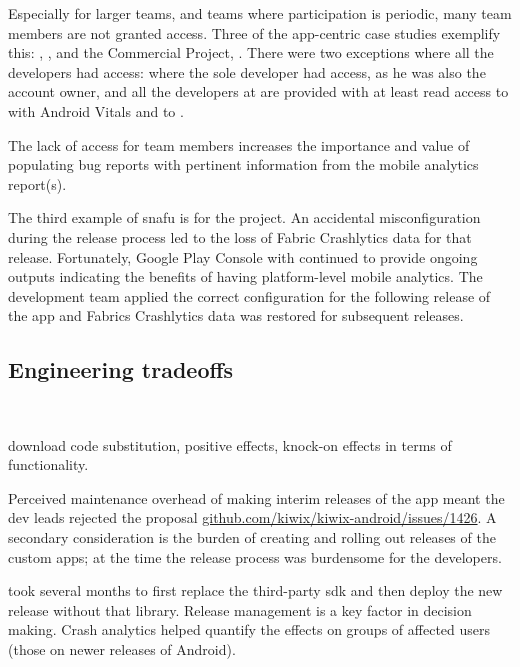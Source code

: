 Especially for larger teams, and teams where participation is periodic, many team members are not granted access. Three of the app-centric case studies exemplify this: , , and the Commercial Project, . There were two exceptions where all the developers had access:  where the sole developer had access, as he was also the account owner, and all the developers at  are provided with at least read access to  with Android Vitals and to .

The lack of access for team members increases the importance and value of populating bug reports with pertinent information from the mobile analytics report(s).

The third example of \Gls{snafu} is for the  project. An accidental misconfiguration during the release process led to the loss of Fabric Crashlytics data for that release. Fortunately, Google Play Console with  continued to provide ongoing outputs indicating the benefits of having platform-level mobile analytics. The development team applied the correct configuration for the following release of the app and Fabrics Crashlytics data was restored for subsequent releases.

\subsection{Engineering tradeoffs}~\label{aiu-engineering-tradeoffs-topic}

 download code substitution, positive effects, knock-on effects in terms of functionality.

Perceived maintenance overhead of making interim releases of the app meant the dev leads rejected the proposal \href{https://github.com/kiwix/kiwix-android/issues/1426}{github.com/kiwix/kiwix-android/issues/1426}. A secondary consideration is the burden of creating and rolling out releases of the custom apps; at the time the release process was burdensome for the developers. 

 took several months to first replace the third-party  \Gls{sdk} and then deploy the new release without that library.
Release management is a key factor in decision making. Crash analytics helped quantify the effects on groups of affected users (those on newer releases of Android).

